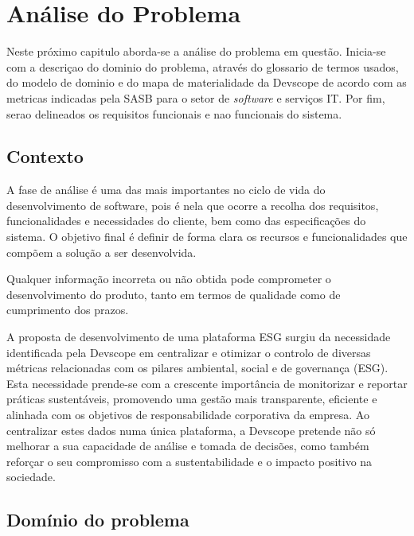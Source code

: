 
\chapter{Análise do Problema}
\label{sec:AP}

Neste próximo capitulo aborda-se a análise do problema em questão. Inicia-se com a descriçao do dominio do problema, através do glossario de termos usados, do modelo de dominio e do mapa de materialidade da Devscope de acordo com as metricas indicadas pela \gls{SASB} para o setor de \textit{software} e serviços IT. Por fim, serao delineados os requisitos funcionais e nao funcionais do sistema.

\section{Contexto}
\label{sec:Context}

A fase de análise é uma das mais importantes no ciclo de vida do desenvolvimento de software, pois é nela que ocorre a recolha dos requisitos, funcionalidades e necessidades do cliente, bem como das especificações do sistema. O objetivo final é definir de forma clara os recursos e funcionalidades que compõem a solução a ser desenvolvida.

Qualquer informação incorreta ou não obtida pode comprometer o desenvolvimento do produto, tanto em termos de qualidade como de cumprimento dos prazos.

A proposta de desenvolvimento de uma plataforma ESG surgiu da necessidade identificada pela Devscope em centralizar e otimizar o controlo de diversas métricas relacionadas com os pilares ambiental, social e de governança (ESG). Esta necessidade prende-se com a crescente importância de monitorizar e reportar práticas sustentáveis, promovendo uma gestão mais transparente, eficiente e alinhada com os objetivos de responsabilidade corporativa da empresa. Ao centralizar estes dados numa única plataforma, a Devscope pretende não só melhorar a sua capacidade de análise e tomada de decisões, como também reforçar o seu compromisso com a sustentabilidade e o impacto positivo na sociedade.

\section{Domínio do problema}
\label{sec:DP} 

